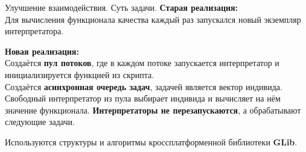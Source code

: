 \documentclass{beamer}
\begin{document}
\begin{frame}{Улучшение взаимодействия. Суть задачи.}
    \large{\textbf{Старая реализация:}}\\
    Для вычисления функционала
    качества каждый раз запускался
    новый экземпляр интерпретатора.
    \bigskip

    \large{\textbf{Новая реализация:}}\\
    Создаётся \textbf{пул потоков},
    где в каждом потоке запускается интерпретатор
    и инициализируется функцией из скрипта.\\
    Создаётся \textbf{асинхронная очередь задач},
    задачей является вектор индивида.\\
    Свободный интерпретатор из пула
    выбирает индивида и вычисляет на нём значение функционала.
    \textbf{Интерпретаторы не перезапускаются},
    а обрабатывают следующие задачи.
    \bigskip

    Используются структуры и алгоритмы
    кроссплатформенной библиотеки \textbf{GLib}.
\end{frame}
\end{document}
